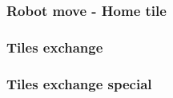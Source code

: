 	\subsubsection{Robot move - Home tile}
	\begin{msc}
		
	\end{msc}
	
	\subsubsection{Tiles exchange}
	\begin{msc}
		
	\end{msc}
	
	\subsubsection{Tiles exchange special}
	\begin{msc}
		
	\end{msc}
	